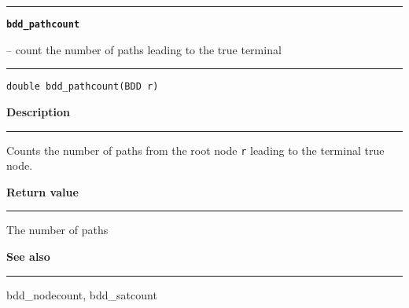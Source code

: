 \begin{minipage}{\textwidth}

\noindent\begin{minipage}{\textwidth}
\rule{\textwidth}{0.5mm}
{\tt\bf bdd\_pathcount }
\--- count the number of paths leading to the true terminal  \hspace{\fill}
\\\rule[1.5ex]{\textwidth}{0.5mm}
\end{minipage}

\noindent\begin{verbatim}
double bdd_pathcount(BDD r) 
\end{verbatim}

\vspace{\parsep}\noindent
{\bf Description}\\\rule[1.5ex]{\textwidth}{0.2mm}\vspace{-1.5ex}\setlength{\parindent}{1em}
Counts the number of paths from the root node {\tt r}
           leading to the terminal true node. 

\setlength{\parindent}{0em}\vspace{\parsep}\vspace{\baselineskip}\noindent
{\bf Return value}\\\rule[1.5ex]{\textwidth}{0.2mm}\vspace{-1.5ex}
The number of paths 

\vspace{\parsep}\vspace{\baselineskip}\noindent
{\bf See also}\\\rule[1.5ex]{\textwidth}{0.2mm}\vspace{-1.5ex}
bdd\_nodecount, bdd\_satcount 
\end{minipage}
\vspace{8ex}
